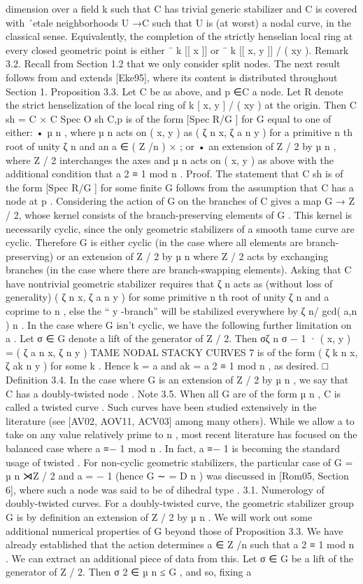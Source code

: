 \documentclass{article}
\begin{document}
dimension over a field k such that C has trivial generic stabilizer and C is covered with ´etale neighborhoods U →C such that U is (at worst) a nodal curve, in the classical sense. Equivalently, the completion of the strictly henselian local ring at every closed geometric point is either ¯ k [[ x ]] or ¯ k [[ x, y ]] / ( xy ). Remark 3.2. Recall from Section 1.2 that we only consider split nodes. The next result follows from and extends [Eke95], where its content is distributed throughout Section 1. Proposition 3.3. Let C be as above, and p ∈C a node. Let R denote the strict henselization of the local ring of k [ x, y ] / ( xy ) at the origin. Then C sh = C × C Spec O sh C,p is of the form [Spec R/G ] for G equal to one of either: • µ n , where µ n acts on ( x, y ) as ( ζ n x, ζ a n y ) for a primitive n th root of unity ζ n and an a ∈ ( Z /n ) × ; or • an extension of Z / 2 by µ n , where Z / 2 interchanges the axes and µ n acts on ( x, y ) as above with the additional condition that a 2 ≡ 1 mod n . Proof. The statement that C sh is of the form [Spec R/G ] for some finite G follows from the assumption that C has a node at p . Considering the action of G on the branches of C gives a map G → Z / 2, whose kernel consists of the branch-preserving elements of G . This kernel is necessarily cyclic, since the only geometric stabilizers of a smooth tame curve are cyclic. Therefore G is either cyclic (in the case where all elements are branch-preserving) or an extension of Z / 2 by µ n where Z / 2 acts by exchanging branches (in the case where there are branch-swapping elements). Asking that C have nontrivial geometric stabilizer requires that ζ n acts as (without loss of generality) ( ζ n x, ζ a n y ) for some primitive n th root of unity ζ n and a coprime to n , else the “ y -branch” will be stabilized everywhere by ζ n/ gcd( a,n ) n . In the case where G isn’t cyclic, we have the following further limitation on a . Let σ ∈ G denote a lift of the generator of Z / 2. Then σζ n σ − 1 · ( x, y ) = ( ζ a n x, ζ n y ) TAME NODAL STACKY CURVES 7 is of the form ( ζ k n x, ζ ak n y ) for some k . Hence k = a and ak = a 2 ≡ 1 mod n , as desired. □ Definition 3.4. In the case where G is an extension of Z / 2 by µ n , we say that C has a doubly-twisted node . Note 3.5. When all G are of the form µ n , C is called a twisted curve . Such curves have been studied extensively in the literature (see [AV02, AOV11, ACV03] among many others). While we allow a to take on any value relatively prime to n , most recent literature has focused on the balanced case where a ≡− 1 mod n . In fact, a ≡− 1 is becoming the standard usage of twisted . For non-cyclic geometric stabilizers, the particular case of G = µ n ⋊Z / 2 and a = − 1 (hence G ∼ = D n ) was discussed in [Rom05, Section 6], where such a node was said to be of dihedral type . 3.1. Numerology of doubly-twisted curves. For a doubly-twisted curve, the geometric stabilizer group G is by definition an extension of Z / 2 by µ n . We will work out some additional numerical properties of G beyond those of Proposition 3.3. We have already established that the action determines a ∈ Z /n such that a 2 ≡ 1 mod n . We can extract an additional piece of data from this. Let σ ∈ G be a lift of the generator of Z / 2. Then σ 2 ∈ µ n ≤ G , and so, fixing a 
\end{document}

